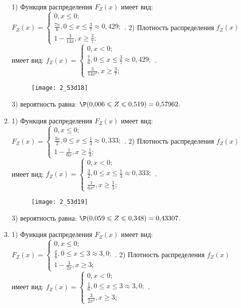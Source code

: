 \documentclass[a4paper,12pt]{article}
\begin{document}
\begin{enumerate}
1) Функция распределения $F_Z(x)$ имеет вид:
$
F_Z(x)=\left\{
\begin{array}{l}
0, x\leqslant 0;\\
\frac{7 x}{6}, 0\leqslant x\leqslant \frac{3}{7}\approx 0,\!429;\\
1 - \frac{3}{14 x}, x\geqslant\frac{3}{7};
\end{array}.
\right.
$
2) Плотность распределения $f_Z(x)$ имеет вид:
$
f_Z(x)=\left\{
\begin{array}{l}
0, x<0;\\
\frac{7}{6}, 0\leqslant x\leqslant \frac{3}{7}\approx 0,\!429;\\
\frac{3}{14 x^{2}}, x\geqslant\frac{3}{7};
\end{array}.
\right.
$


\begin{figure}[H]
    \texttt{[image: 2\_53d18]}
\end{figure}


3) вероятность равна:
$
\P(0,\!006\leqslant Z\leqslant 0,\!519)=
0,\!57962.
$



\item


1) Функция распределения $F_Z(x)$ имеет вид:
$
F_Z(x)=\left\{
\begin{array}{l}
0, x\leqslant 0;\\
\frac{3 x}{2}, 0\leqslant x\leqslant \frac{1}{3}\approx 0,\!333;\\
1 - \frac{1}{6 x}, x\geqslant\frac{1}{3};
\end{array}.
\right.
$
2) Плотность распределения $f_Z(x)$ имеет вид:
$
f_Z(x)=\left\{
\begin{array}{l}
0, x<0;\\
\frac{3}{2}, 0\leqslant x\leqslant \frac{1}{3}\approx 0,\!333;\\
\frac{1}{6 x^{2}}, x\geqslant\frac{1}{3};
\end{array}.
\right.
$


\begin{figure}[H]
    \texttt{[image: 2\_53d19]}
\end{figure}


3) вероятность равна:
$
\P(0,\!059\leqslant Z\leqslant 0,\!348)=
0,\!43307.
$



\item


1) Функция распределения $F_Z(x)$ имеет вид:
$
F_Z(x)=\left\{
\begin{array}{l}
0, x\leqslant 0;\\
\frac{x}{6}, 0\leqslant x\leqslant 3\approx 3,\!0;\\
1 - \frac{3}{2 x}, x\geqslant3;
\end{array}.
\right.
$
2) Плотность распределения $f_Z(x)$ имеет вид:
$
f_Z(x)=\left\{
\begin{array}{l}
0, x<0;\\
\frac{1}{6}, 0\leqslant x\leqslant 3\approx 3,\!0;\\
\frac{3}{2 x^{2}}, x\geqslant3;
\end{array}.
\right.
$



\end{enumerate}
\end{document}
